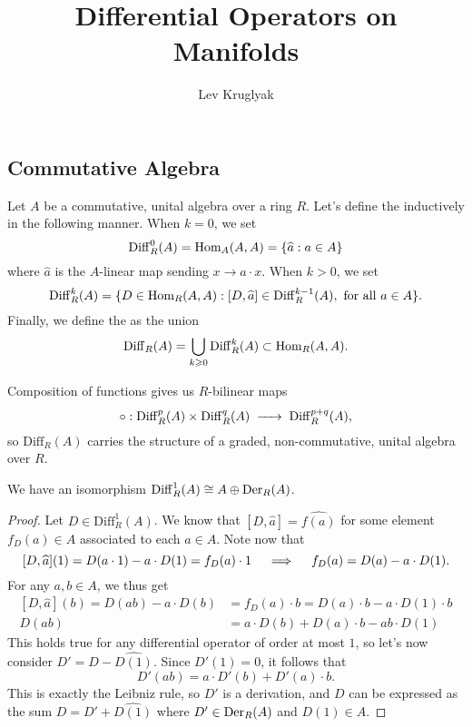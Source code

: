 \documentclass{lkx_paper}
\title{\textbf{Differential Operators on Manifolds}}
\date{}
\author{Lev Kruglyak}
\providecommand{\Diff}{\mathrm{Diff}}
\begin{document}
\maketitle

\subsection*{Commutative Algebra}

\begin{definition*}
	Let $A$ be a commutative, unital algebra over a ring $R$. Let's define the  inductively in the following manner. When $k=0$, we set
	\[
		\Diff^0_R(A) = \Hom_A(A,A) = \{ \widehat{a} : a\in A\}
	\]
	where $\widehat{a}$ is the $A$-linear map sending $x\to a\cdot x$. When $k>0$, we set
	\[
		\Diff^k_R(A) = \{
		D\in \Hom_R(A, A) : [D, \widehat{a}]\in \Diff^{k-1}_R(A),\textrm{ for all }a\in A
		\}.
	\]
	Finally, we define the  as the union
	\[
		\Diff_R(A) = \bigcup_{k\geq 0} \Diff^k_R(A) \subset \Hom_R(A, A).
	\]
\end{definition*}

\begin{proposition*}
	Composition of functions gives us $R$-bilinear maps
	\[
		\circ : \Diff^p_R(A)\times \Diff^q_R(A) \longto \Diff^{p+q}_R(A),
	\]
	so $\Diff_R(A)$ carries the structure of a graded, non-commutative, unital algebra over $R$.
\end{proposition*}

\begin{proposition*}
	We have an isomorphism $\Diff^1_R(A) \cong A\oplus \Der_R(A)$.
\end{proposition*}

\begin{proof}
	Let $D\in \Diff^1_R(A)$. We know that $[D, \widehat{a}] = \widehat{f(a)}$ for some element $f_D(a)\in A$ associated to each $a\in A$. Note now that
	\[
		[D,\widehat{a}](1) = D(a\cdot 1) - a\cdot D(1) = f_D(a)\cdot 1 \quad\implies\quad f_D(a) = D(a)-a\cdot D(1).
	\]
	For any $a,b\in A$, we thus get
	\[
		\begin{aligned}
			[D, \widehat{a}](b) = D(ab) - a\cdot D(b) & = f_D(a)\cdot b = D(a)\cdot b-a\cdot D(1)\cdot b \\
			D(ab)                                     & = a\cdot D(b) + D(a)\cdot b - ab\cdot D(1)
		\end{aligned}
	\]
	This holds true for any differential operator of order at most $1$, so let's now consider $D'=D - \widehat{D(1)}$. Since $D'(1)=0$, it follows that
	\[
		D'(ab) = a\cdot D'(b) + D'(a)\cdot b.
	\]
	This is exactly the Leibniz rule, so $D'$ is a derivation, and $D$ can be expressed as the sum $D = D' + \widehat{D(1)}$ where $D'\in \mathrm{Der}_R(A)$ and $D(1)\in A$.
\end{proof}
\end{document}
